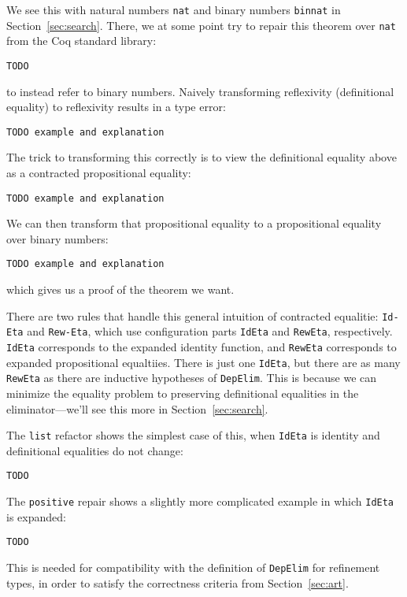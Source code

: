 We see this with natural numbers \lstinline{nat} and binary numbers \lstinline{binnat}
in Section~\ref{sec:search}.
There, we at some point try to repair this theorem over \lstinline{nat} from the Coq standard library:

\begin{lstlisting}
TODO
\end{lstlisting}
to instead refer to binary numbers.
Naively transforming reflexivity (definitional equality) to reflexivity results in a type error:

\begin{lstlisting}
TODO example and explanation
\end{lstlisting}
The trick to transforming this correctly is to view the definitional equality above as a contracted propositional equality:

\begin{lstlisting}
TODO example and explanation
\end{lstlisting}
We can then transform that propositional equality to a propositional equality over binary numbers:

\begin{lstlisting}
TODO example and explanation
\end{lstlisting}
which gives us a proof of the theorem we want.

There are two rules that handle this general intuition of contracted equalitie:
\lstinline{Id-Eta} and \lstinline{Rew-Eta}, which use configuration parts
\lstinline{IdEta} and \lstinline{RewEta}, respectively.
\lstinline{IdEta} corresponds to the expanded identity function, and \lstinline{RewEta}
corresponds to expanded propositional equaltiies.
There is just one \lstinline{IdEta}, but there are as many \lstinline{RewEta} as there are
inductive hypotheses of \lstinline{DepElim}.
This is because we can minimize the equality problem to preserving definitional equalities
in the eliminator---we'll see this more in Section~\ref{sec:search}.

The \lstinline{list} refactor shows the simplest case of this, when \lstinline{IdEta} is identity
and definitional equalities do not change:

\begin{lstlisting}
TODO
\end{lstlisting}
The \lstinline{positive} repair shows a slightly more complicated example in which \lstinline{IdEta} is expanded:

\begin{lstlisting}
TODO
\end{lstlisting}
This is needed for compatibility with the definition of \lstinline{DepElim} for refinement types,
in order to satisfy the correctness criteria from Section~\ref{sec:art}.

